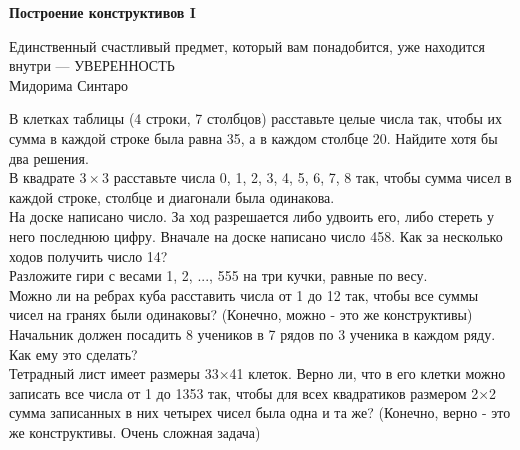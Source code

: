 \centerline{\bf \Huge Построение конструктивов I}


\begin{flushright}
        \scriptsize{Единственный счастливый предмет, который вам понадобится, уже находится внутри — УВЕРЕННОСТЬ\\ Мидорима Синтаро}
\end{flushright}

 В клетках таблицы (4 строки, 7 столбцов) расставьте целые числа так, чтобы их сумма в каждой строке была равна 35, а в каждом столбце 20. Найдите хотя бы два решения.\\

 В квадрате $3\times3$ расставьте числа 0, 1, 2, 3, 4, 5, 6, 7, 8 так, чтобы сумма чисел в каждой строке, столбце и диагонали была одинакова.\\

 На доске написано число. За ход разрешается либо удвоить его, либо стереть у него последнюю цифру. Вначале на доске написано число 458. Как за несколько ходов получить число 14?\\

 Разложите гири с весами 1, 2, ..., 555 на три кучки, равные по весу.\\

 Можно ли на ребрах куба расставить числа от 1 до 12 так, чтобы все суммы чисел на гранях были одинаковы? (Конечно, можно - это же конструктивы)\\

 Начальник должен посадить 8 учеников в 7 рядов по 3 ученика в каждом ряду. Как ему это сделать?\\

 Тетрадный лист имеет размеры 33×41 клеток. Верно ли, что в его клетки можно записать все числа от 1 до 1353 так, чтобы для всех квадратиков размером 2×2 сумма записанных в них четырех чисел была одна и та же? (Конечно, верно - это же конструктивы. Очень сложная задача)